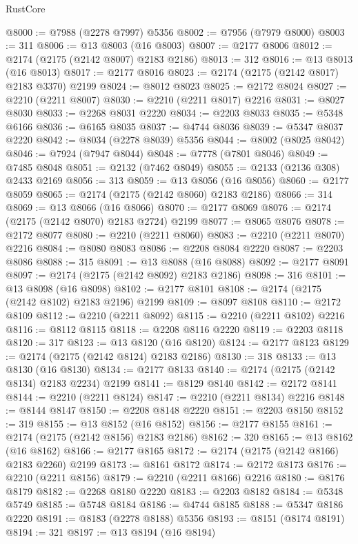 \begin{lexlean}{RustCore}
\begin{coremodule}
@8000 := @7988 (@2278 @7997) @5356
@8002 := @7956 (@7979 @8000)
@8003 := 311
@8006 := @13 @8003 (@16 @8003)
@8007 := @2177 @8006
@8012 := @2174 (@2175 (@2142 @8007) @2183 @2186)
@8013 := 312
@8016 := @13 @8013 (@16 @8013)
@8017 := @2177 @8016
@8023 := @2174 (@2175 (@2142 @8017) @2183 @3370) @2199
@8024 := @8012 @8023
@8025 := @2172 @8024
@8027 := @2210 (@2211 @8007)
@8030 := @2210 (@2211 @8017) @2216
@8031 := @8027 @8030
@8033 := @2268 @8031 @2220
@8034 := @2203 @8033
@8035 := @5348 @6166
@8036 := @6165 @8035
@8037 := @4744 @8036
@8039 := @5347 @8037 @2220
@8042 := @8034 (@2278 @8039) @5356
@8044 := @8002 (@8025 @8042)
@8046 := @7924 (@7947 @8044)
@8048 := @7778 (@7801 @8046)
@8049 := @7485 @8048
@8051 := @2132 (@7462 @8049)
@8055 := @2133 (@2136 @308) @2433 @2169
@8056 := 313
@8059 := @13 @8056 (@16 @8056)
@8060 := @2177 @8059
@8065 := @2174 (@2175 (@2142 @8060) @2183 @2186)
@8066 := 314
@8069 := @13 @8066 (@16 @8066)
@8070 := @2177 @8069
@8076 := @2174 (@2175 (@2142 @8070) @2183 @2724) @2199
@8077 := @8065 @8076
@8078 := @2172 @8077
@8080 := @2210 (@2211 @8060)
@8083 := @2210 (@2211 @8070) @2216
@8084 := @8080 @8083
@8086 := @2208 @8084 @2220
@8087 := @2203 @8086
@8088 := 315
@8091 := @13 @8088 (@16 @8088)
@8092 := @2177 @8091
@8097 := @2174 (@2175 (@2142 @8092) @2183 @2186)
@8098 := 316
@8101 := @13 @8098 (@16 @8098)
@8102 := @2177 @8101
@8108 := @2174 (@2175 (@2142 @8102) @2183 @2196) @2199
@8109 := @8097 @8108
@8110 := @2172 @8109
@8112 := @2210 (@2211 @8092)
@8115 := @2210 (@2211 @8102) @2216
@8116 := @8112 @8115
@8118 := @2208 @8116 @2220
@8119 := @2203 @8118
@8120 := 317
@8123 := @13 @8120 (@16 @8120)
@8124 := @2177 @8123
@8129 := @2174 (@2175 (@2142 @8124) @2183 @2186)
@8130 := 318
@8133 := @13 @8130 (@16 @8130)
@8134 := @2177 @8133
@8140 := @2174 (@2175 (@2142 @8134) @2183 @2234) @2199
@8141 := @8129 @8140
@8142 := @2172 @8141
@8144 := @2210 (@2211 @8124)
@8147 := @2210 (@2211 @8134) @2216
@8148 := @8144 @8147
@8150 := @2208 @8148 @2220
@8151 := @2203 @8150
@8152 := 319
@8155 := @13 @8152 (@16 @8152)
@8156 := @2177 @8155
@8161 := @2174 (@2175 (@2142 @8156) @2183 @2186)
@8162 := 320
@8165 := @13 @8162 (@16 @8162)
@8166 := @2177 @8165
@8172 := @2174 (@2175 (@2142 @8166) @2183 @2260) @2199
@8173 := @8161 @8172
@8174 := @2172 @8173
@8176 := @2210 (@2211 @8156)
@8179 := @2210 (@2211 @8166) @2216
@8180 := @8176 @8179
@8182 := @2268 @8180 @2220
@8183 := @2203 @8182
@8184 := @5348 @5749
@8185 := @5748 @8184
@8186 := @4744 @8185
@8188 := @5347 @8186 @2220
@8191 := @8183 (@2278 @8188) @5356
@8193 := @8151 (@8174 @8191)
@8194 := 321
@8197 := @13 @8194 (@16 @8194)

\end{coremodule}
\end{lexlean}
